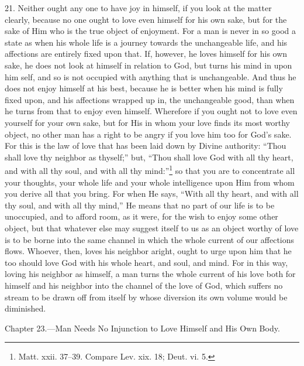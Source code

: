 21. Neither ought any one to have joy in himself, if you look at the matter clearly, because no one ought to love even himself for his own sake, but for the sake of Him who is the true object of enjoyment. For a man is never in so good a state as when his whole life is a journey towards the unchangeable life, and his affections are entirely fixed upon that. If, however, he loves himself for his own sake, he does not look at himself in relation to God, but turns his mind in upon him  self, and so is not occupied with anything that is unchangeable. And thus he does not enjoy himself at his best, because he is better when his mind is fully fixed upon, and his affections wrapped up in, the unchangeable good, than when he turns from that to enjoy even himself. Wherefore if you ought not to love even yourself for your own sake, but for His in whom your love finds its most worthy object, no other man has a right to be angry if you love him too for God’s sake. For this is the law of love that has been laid down by Divine authority: “Thou shall love thy neighbor as thyself;” but, “Thou shall love God with all thy heart, and with all thy soul, and with all thy mind:”\footnote{Matt. xxii. 37–39. Compare Lev. xix. 18; Deut. vi. 5.} so that you are to concentrate all your thoughts, your whole life and your whole intelligence upon Him from whom you derive all that you bring. For when He says, “With all thy heart, and with all thy soul, and with all thy mind,” He means that no part of our life is to be unoccupied, and to afford room, as it were, for the wish to enjoy some other object, but that whatever else may suggest itself to us as an object worthy of love is to be borne into the same channel in which the whole current of our affections flows. Whoever, then, loves his neighbor aright, ought to urge upon him that he too should love God with his whole heart, and soul, and mind. For in this way, loving his neighbor as himself, a man turns the whole current of his love both for himself and his neighbor into the channel of the love of God, which suffers no stream to be drawn off from itself by whose diversion its own volume would be diminished.


Chapter 23.—Man Needs No Injunction to Love Himself and His Own Body.

